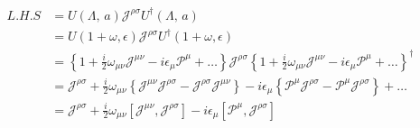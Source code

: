     \[
        \begin{aligned}
                L.H.S&={U}(\Lambda,\,a)\mathscr{J}^{\rho\sigma}{U}^\dagger(\Lambda,\,a)\\&={U}(1+\omega,\epsilon)\mathscr{J}^{\rho\sigma}{U}^\dagger(1+\omega,\epsilon)
                \\&=\left\{{1}+\frac{i}{2}\omega_{\mu\nu}\mathscr{J}^{\mu\nu}-i\epsilon_\mu \mathscr{P}^\mu+\ldots\right\}
                \mathscr{J}^{\rho\sigma}
                \left\{{1}+\frac{i}{2}\omega_{\mu\nu}\mathscr{J}^{\mu\nu}-i\epsilon_\mu \mathscr{P}^\mu+\ldots\right\}^\dagger
                \\&=\mathscr{J}^{\rho\sigma}
                +\frac{i}{2}\omega_{\mu\nu}\left\{\mathscr{J}^{\mu\nu}\mathscr{J}^{\rho\sigma}-\mathscr{J}^{\rho\sigma}\mathscr{J}^{\mu\nu} \right\}
                -i\epsilon_\mu\left\{\mathscr{P}^\mu\mathscr{J}^{\rho\sigma}-\mathscr{P}^\mu\mathscr{J}^{\rho\sigma} \right\}+\ldots
                \\&=\mathscr{J}^{\rho\sigma}
                +\frac{i}{2}\omega_{\mu\nu}\left[\mathscr{J}^{\mu\nu},\mathscr{J}^{\rho\sigma} \right]
                -i\epsilon_\mu\left[\mathscr{P}^\mu,\mathscr{J}^{\rho\sigma} \right]
    \end{aligned}
    \] 
